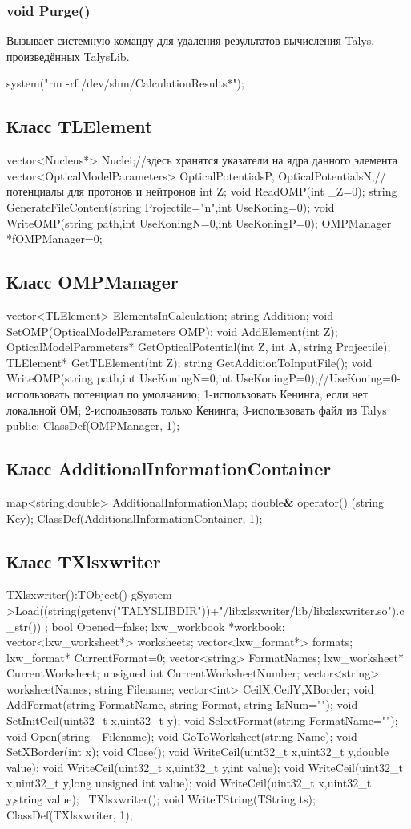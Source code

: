 \documentclass[a4paper,12pt]{extarticle}
\begin{document}
\subsubsection{void Purge()}
Вызывает системную команду для удаления результатов вычисления Talys, произведённых TalysLib.

system("rm -rf /dev/shm/CalculationResults*");

\subsection{Класс TLElement}
vector<Nucleus*> Nuclei;//здесь хранятся указатели на ядра данного элемента
vector<OpticalModelParameters> OpticalPotentialsP, OpticalPotentialsN;//потенциалы для протонов и нейтронов
int Z;
void ReadOMP(int _Z=0);
string GenerateFileContent(string Projectile="n",int UseKoning=0);
void WriteOMP(string path,int UseKoningN=0,int UseKoningP=0);
OMPManager *fOMPManager=0;

\subsection{Класс OMPManager}
vector<TLElement> ElementsInCalculation;
string Addition;
void SetOMP(OpticalModelParameters OMP);
void AddElement(int Z);
OpticalModelParameters* GetOpticalPotential(int Z, int A, string Projectile);
TLElement* GetTLElement(int Z);
string GetAdditionToInputFile();
void WriteOMP(string path,int UseKoningN=0,int UseKoningP=0);//UseKoning=0-использовать потенциал по умолчанию; 1-использовать Кенинга, если нет локальной ОМ; 2-использовать только Кенинга; 3-использовать файл из Talys
public:
ClassDef(OMPManager, 1);
\subsection{Класс AdditionalInformationContainer}
map<string,double> AdditionalInformationMap;
double\textbf{\&} operator() (string Key);
ClassDef(AdditionalInformationContainer, 1);

\subsection{Класс TXlsxwriter}
TXlsxwriter():TObject() {gSystem->Load((string(getenv("TALYSLIBDIR"))+"/libxlsxwriter/lib/libxlsxwriter.so").c_str()) ;}
bool Opened=false;
lxw_workbook  *workbook;
vector<lxw_worksheet*> worksheets;
vector<lxw_format*> formats;
lxw_format* CurrentFormat=0;
vector<string> FormatNames;
lxw_worksheet* CurrentWorksheet;
unsigned int CurrentWorksheetNumber;
vector<string> worksheetNames;
string Filename;
vector<int> CeilX,CeilY,XBorder;
void AddFormat(string FormatName, string Format, string IsNum="");
void SetInitCeil(uint32_t x,uint32_t y);
void SelectFormat(string FormatName="");
void Open(string _Filename);
void GoToWorksheet(string Name);
void SetXBorder(int x);
void Close();
void WriteCeil(uint32_t x,uint32_t y,double value);
void WriteCeil(uint32_t x,uint32_t y,int value);
void WriteCeil(uint32_t x,uint32_t y,long unsigned int value);
void WriteCeil(uint32_t x,uint32_t y,string value);
~TXlsxwriter();
void WriteTString(TString ts);
ClassDef(TXlsxwriter, 1);
\end{document}
